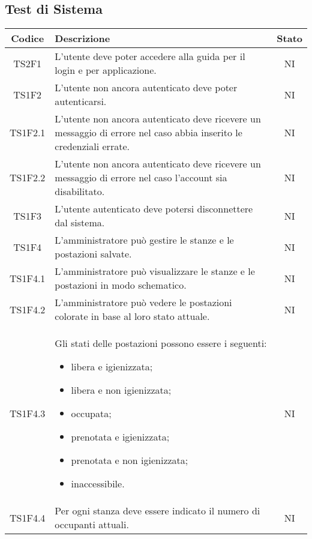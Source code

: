 	\subsection{Test di Sistema}
	\begin{center}
		\begin{longtable}{|c|p{10cm}|c|}
			\hline
			\rowcolor{lighter-grayer}
			\textbf{Codice} & \textbf{Descrizione} & \textbf{Stato}  \\ 
						
			\hline
			\endhead
			
			\hline
			TS2F1 & L'utente deve poter accedere alla guida per il login e per applicazione. & NI \\
			\hline
			TS1F2 & L'utente non ancora autenticato deve poter autenticarsi. & NI \\			
			\hline
			TS1F2.1 & L'utente non ancora autenticato deve ricevere un messaggio di errore nel caso abbia inserito le credenziali errate. & NI \\			
			\hline
			TS1F2.2 & L'utente non ancora autenticato deve ricevere un messaggio di errore nel caso l'account sia disabilitato. & NI \\			
			\hline
			TS1F3 & L'utente autenticato deve potersi disconnettere dal sistema. & NI \\			
			\hline
			TS1F4 & L'amministratore può gestire le stanze e le postazioni salvate. & NI \\			
			\hline
			TS1F4.1 & L'amministratore può visualizzare le stanze e le postazioni in modo schematico. & NI \\			
			\hline
			TS1F4.2 & L'amministratore può vedere le postazioni colorate in base al loro stato attuale. & NI \\			
			\hline
			TS1F4.3 & Gli stati delle postazioni possono essere i seguenti:
			 \begin{itemize}
			 	\item libera e igienizzata;
			 	\item libera e non igienizzata;
			 	\item occupata;
			 	\item prenotata e igienizzata;
			 	\item prenotata e non igienizzata;
			 	\item inaccessibile.
			 \end{itemize}
			 & NI \\			
			\hline
			TS1F4.4 & Per ogni stanza deve essere indicato il numero di occupanti attuali. & NI \\			

\end{longtable}
\end{center}
